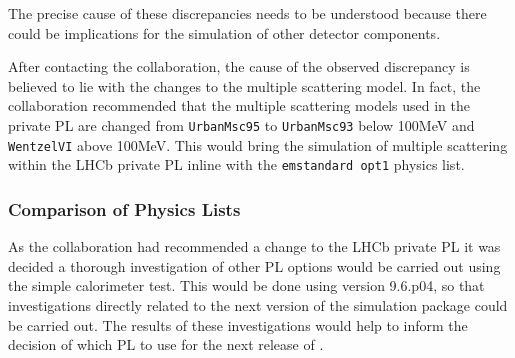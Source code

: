 The precise cause of these discrepancies needs to be understood because there could be implications for the simulation of other detector components.

After contacting the \geant collaboration, the cause of the observed discrepancy is believed to lie with the changes to the multiple scattering model.  In fact, the \geant collaboration recommended that the multiple scattering models used in the \lhcb private PL are changed from \texttt{UrbanMsc95} to \texttt{UrbanMsc93} below 100MeV and \texttt{WentzelVI} above 100MeV.  This would bring the simulation of multiple scattering within the LHCb private PL inline with the \geant \texttt{emstandard opt1} physics list.
\clearpage
\subsubsection{Comparison of Physics Lists}
\label{sec:Comparison of PL}
As the \geant collaboration had recommended a change to the LHCb private PL it was decided a thorough investigation of other PL options would be carried out using the simple calorimeter test.  This would be done using \geant version 9.6.p04, so that investigations directly related to the next version of the \lhcb simulation package could be carried out.  The results of these investigations would help to inform the decision of which PL to use for the next release of \gauss.  

